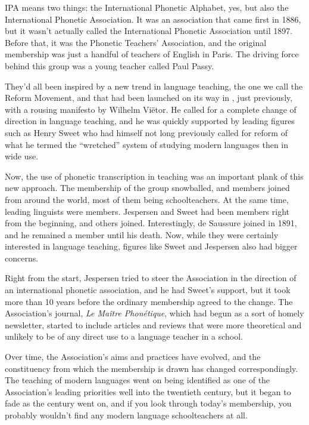 \documentclass[output=paper]{langscibook}
\begin{document}
IPA means two things: the International Phonetic Alphabet, yes, but also the International Phonetic Association. It was an association that came first in 1886, but it wasn’t actually called the International Phonetic Association until 1897. Before that, it was the Phonetic Teachers’ Association, and the original membership was just a handful of teachers of English in Paris. The driving force behind this group was a young teacher called Paul Passy. 

They’d all been inspired by a new trend in language teaching, the one we call the Reform Movement, and that had been launched on its way in \citeyear{vietor1882a}, just previously, with a rousing manifesto by Wilhelm Viëtor. He called for a complete change of direction in language teaching, and he was quickly supported by leading figures such as Henry Sweet who had himself not long previously called for reform of what he termed the ``wretched'' system of studying modern languages then in wide use. 

Now, the use of phonetic transcription in teaching was an important plank of this new approach. The membership of the group snowballed, and members joined from around the world, most of them being schoolteachers. At the same time, leading linguists were members. Jespersen and Sweet had been members right from the beginning, and others joined. Interestingly, de Saussure joined in 1891, and he remained a member until his death. Now, while they were certainly interested in language teaching, figures like Sweet and Jespersen also had bigger concerns. 

Right from the start, Jespersen tried to steer the Association in the direction of an international phonetic association, and he had Sweet’s support, but it took more than 10 years before the ordinary membership agreed to the change. The Association’s journal, \textit{Le Maître Phonétique}, which had begun as a sort of homely newsletter, started to include articles and reviews that were more theoretical and unlikely to be of any direct use to a language teacher in a school. 

Over time, the Association’s aims and practices have evolved, and the constituency from which the membership is drawn has changed correspondingly. The teaching of modern languages went on being identified as one of the Association’s leading priorities well into the twentieth century, but it began to fade as the century went on, and if you look through today’s membership, you probably wouldn’t find any modern language schoolteachers at all. 
\end{document}

